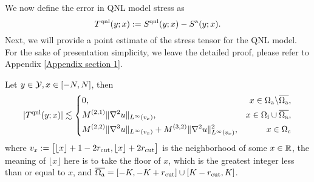 We now define the error in QNL model stress as
\begin{equation*}
	T^{{\rm qnl}}(y;x) := S^{{\rm qnl}}(y;x) -S^{{\rm a}}(y;x).
\end{equation*}
Next, we will provide a point estimate of the stress tensor for the QNL model. For the sake of presentation simplicity, we leave the detailed proof, please refer to Appendix \ref{Appendix section 1}.

\begin{proposition}\label{Pointwise coupling stress tensor}
	Let $y\in\mathcal{Y}, x \in [-N,N]$, then 
	\begin{equation*}
		\vert T^{{\rm qnl}}(y;x) \vert \lesssim \left\{
		\begin{aligned}
			&0, &x \in \Omega_{{\rm a}} \backslash \overline{\Omega_{{\rm a}}},\\
			&M^{(2,1)}\Vert \nabla^{2}u\Vert_{L^{\infty}(v_{x})}, &x\in \Omega_{{\rm i}} \cup \overline{\Omega_{{\rm a}}},\\
			&M^{(2,2)}\Vert \nabla^{3}u\Vert_{L^{\infty}(v_{x})}+M^{(3,2)}\Vert \nabla^{2}u\Vert_{L^{\infty}(v_{x})}^{2}, &x \in \Omega_{{\rm c}}
		\end{aligned}
		\right.
	\end{equation*}
	where $v_{x}:=\big[\lfloor x\rfloor+1-2r_{{\rm cut}},\lfloor x\rfloor+2r_{{\rm cut}}\big]$ is the neighborhood of some $x\in \mathbb{R}$, the meaning of $\lfloor x\rfloor$ here is to take the floor of $x$, which is the greatest integer less than or equal to $x$, and $\overline{\Omega_{{\rm a}}} = [-K,-K+r_{{\rm cut}}]\cup [K-r_{{\rm cut}},K]$.
\end{proposition}

	
